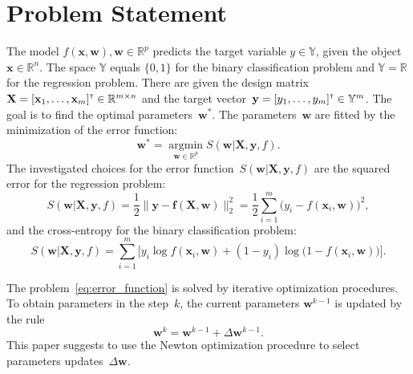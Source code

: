\documentclass[a4paper,12pt]{article}
\theoremstyle{plain} %
\theoremstyle{definition} %
\theoremstyle{remark} %
\newcommand{\bw}{\mathbf{w}}
\newcommand{\by}{\mathbf{y}}
\newcommand{\bx}{\mathbf{x}}
\newcommand{\bbR}{\mathbb{R}}
\newcommand{\bbY}{\mathbb{Y}}
\newcommand{\bX}{\mathbf{X}}
\newcommand{\T}{{\text{\tiny\sffamily\upshape\mdseries T}}}
\newcommand{\argmin}{\mathop{\arg \min}\limits}
\begin{document}
		
	\section*{Problem Statement}

	The model $f( \bx, \bw), \bw \in \mathbb{R}^p$ predicts the target variable $y \in \bbY$, given the object $\bx \in \bbR^{n}$. The space $\bbY$ equals $\{0, 1\}$ for the binary classification problem and $\bbY = \bbR$ for the regression problem.
	There are given the design matrix~$\bX = [\bx_1, \dots, \bx_m]^{\T} \in \bbR^{m \times n}$ and the target vector~$\by = [y_1, \dots, y_m]^{\T} \in \bbY^{m}$. 
	The goal is to find the optimal parameters~$\bw^*$.
	The parameters~$\bw$ are fitted by the minimization of the error function:
	\begin{equation}
		\bw^* = \argmin_{\bw \in \bbR^p} S(\bw | \bX, \by, f).
		\label{eq:error_function}
	\end{equation}
	The investigated choices for the error function~$S(\bw | \bX, \by, f)$ are
	the squared error for the regression problem: 
		\begin{equation}
			S(\bw | \bX, \by, f) = \frac 12 \| \by - \mathbf{f}(\bX, \bw) \|_2^2 = \frac 12 \sum_{i=1}^m \bigl( y_i - f(\bx_i,  \bw)\bigr)^2,
			\label{eq:squared_error}
		\end{equation}
	 and the cross-entropy for the binary classification problem: 
		\begin{equation}
			S(\bw | \bX, \by, f) = \sum_{i=1}^m \bigl[y_i \log f (\bx_i , \bw) + (1-y_i) \log \bigl(1 - f (\bx_i , \bw)\bigr)\bigr].
			\label{eq:log_loss}
		\end{equation}
	
	The problem~\eqref{eq:error_function} is solved by iterative optimization procedures. 
	To obtain parameters in the step~$k$, the current parameters $\bw^{k-1}$ is updated by the rule
	\begin{equation}
		\bw^k = \bw^{k - 1} + \Delta \bw^{k - 1}.
		\label{eq:update_rule}
	\end{equation}
	This paper suggests to use the Newton optimization procedure to select parameters updates~$\Delta \bw$.
	
\end{document}
